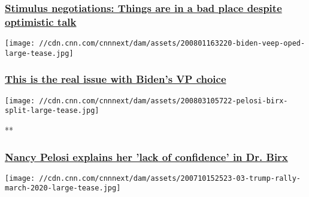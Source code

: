 \hypertarget{stimulus-negotiations-things-are-in-a-bad-place-despite-optimistic-talk}{%
\subsubsection{\texorpdfstring{\href{/2020/08/03/politics/stimulus-negotiations-state-of-play/index.html}{Stimulus
negotiations: Things are in a bad place despite optimistic
talk}}{Stimulus negotiations: Things are in a bad place despite optimistic talk}}\label{stimulus-negotiations-things-are-in-a-bad-place-despite-optimistic-talk}}

\href{/2020/08/01/opinions/bidens-pick-for-vice-president-will-be-about-energizing-the-base-louis/index.html}{}

\texttt{[image: //cdn.cnn.com/cnnnext/dam/assets/200801163220-biden-veep-oped-large-tease.jpg]}

\hypertarget{this-is-the-real-issue-with-bidens-vp-choice}{%
\subsubsection{\texorpdfstring{\href{/2020/08/01/opinions/bidens-pick-for-vice-president-will-be-about-energizing-the-base-louis/index.html}{This
is the real issue with Biden's VP
choice}}{This is the real issue with Biden's VP choice}}\label{this-is-the-real-issue-with-bidens-vp-choice}}

\href{/videos/politics/2020/08/03/nancy-pelosi-lack-of-confidence-in-dr-birx-sot-nr-vpx.cnn}{}

\texttt{[image: //cdn.cnn.com/cnnnext/dam/assets/200803105722-pelosi-birx-split-large-tease.jpg]}

**

\hypertarget{nancy-pelosi-explains-her-lack-of-confidence-in-dr-birx}{%
\subsubsection{\texorpdfstring{\href{/videos/politics/2020/08/03/nancy-pelosi-lack-of-confidence-in-dr-birx-sot-nr-vpx.cnn}{Nancy
Pelosi explains her 'lack of confidence' in Dr.
Birx}}{Nancy Pelosi explains her 'lack of confidence' in Dr. Birx}}\label{nancy-pelosi-explains-her-lack-of-confidence-in-dr-birx}}

\href{/2020/08/02/politics/trump-trails-north-carolina/index.html}{}

\texttt{[image: //cdn.cnn.com/cnnnext/dam/assets/200710152523-03-trump-rally-march-2020-large-tease.jpg]}

